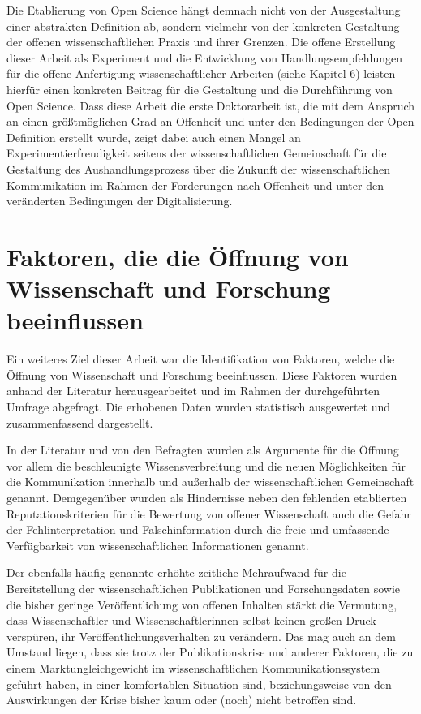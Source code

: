 Die Etablierung von Open Science hängt demnach nicht von der Ausgestaltung einer abstrakten Definition ab, sondern vielmehr von der konkreten Gestaltung der offenen wissenschaftlichen Praxis und ihrer Grenzen. Die offene Erstellung dieser Arbeit als Experiment und die Entwicklung von Handlungsempfehlungen für die offene Anfertigung wissenschaftlicher Arbeiten (siehe Kapitel 6) leisten hierfür einen konkreten Beitrag für die Gestaltung und die Durchführung von Open Science. Dass diese Arbeit die erste Doktorarbeit ist, die mit dem Anspruch an einen größtmöglichen Grad an Offenheit und unter den Bedingungen der Open Definition erstellt wurde, zeigt dabei auch einen Mangel an Experimentierfreudigkeit seitens der wissenschaftlichen Gemeinschaft für die Gestaltung des Aushandlungsprozess über die Zukunft der wissenschaftlichen Kommunikation im Rahmen der Forderungen nach Offenheit und unter den veränderten Bedingungen der Digitalisierung.

\section{Faktoren, die die Öffnung von Wissenschaft und Forschung beeinflussen}

Ein weiteres Ziel dieser Arbeit war die Identifikation von Faktoren, welche die Öffnung von Wissenschaft und Forschung beeinflussen. Diese Faktoren wurden anhand der Literatur herausgearbeitet und im Rahmen der durchgeführten Umfrage abgefragt. Die erhobenen Daten wurden statistisch ausgewertet und zusammenfassend dargestellt.

In der Literatur und von den Befragten wurden als Argumente für die Öffnung vor allem die beschleunigte Wissensverbreitung und die neuen Möglichkeiten für die Kommunikation innerhalb und außerhalb der wissenschaftlichen Gemeinschaft genannt. Demgegenüber wurden als Hindernisse neben den fehlenden etablierten Reputationskriterien für die Bewertung von offener Wissenschaft auch die Gefahr der Fehlinterpretation und Falschinformation durch die freie und umfassende Verfügbarkeit von wissenschaftlichen Informationen genannt.

Der ebenfalls häufig genannte erhöhte zeitliche Mehraufwand für die Bereitstellung der wissenschaftlichen Publikationen und Forschungsdaten sowie die bisher geringe Veröffentlichung von offenen Inhalten stärkt die Vermutung, dass Wissenschaftler und Wissenschaftlerinnen selbst keinen großen Druck verspüren, ihr Veröffentlichungsverhalten zu verändern. Das mag auch an dem Umstand liegen, dass sie trotz der Publikationskrise und anderer Faktoren, die zu einem Marktungleichgewicht im wissenschaftlichen Kommunikationssystem geführt haben, in einer komfortablen Situation sind, beziehungsweise von den Auswirkungen der Krise bisher kaum oder (noch) nicht betroffen sind.

